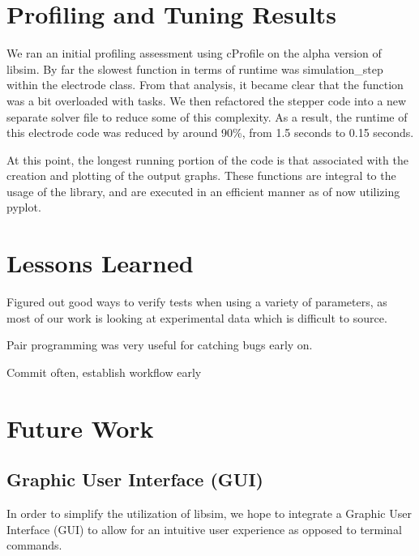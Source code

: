 \documentclass[letterpaper,10pt,english]{sphinxmanual}
\begin{document}
\chapter{Profiling and Tuning Results}
\label{\detokenize{profiling:profiling-and-tuning-results}}\label{\detokenize{profiling::doc}}
\sphinxAtStartPar
We ran an initial profiling assessment using cProfile on the alpha version of libsim.
By far the slowest function in terms of runtime was simulation\_step within the electrode
class. From that analysis, it became clear that the function was a bit overloaded with
tasks. We then refactored the stepper code into a new separate solver file to reduce
some of this complexity. As a result, the runtime of this electrode code was reduced
by around 90\%, from 1.5 seconds to 0.15 seconds.

\sphinxAtStartPar
At this point, the longest running portion of the code is that associated with the
creation and plotting of the output graphs. These functions are integral to the
usage of the library, and are executed in an efficient manner as of now utilizing pyplot.


\chapter{Lessons Learned}
\label{\detokenize{lessons_learned:lessons-learned}}\label{\detokenize{lessons_learned::doc}}
\sphinxAtStartPar
Figured out good ways to verify tests when using a variety of parameters,
as most of our work is looking at experimental data which is difficult
to source.

\sphinxAtStartPar
Pair programming was very useful for catching bugs early on.

\sphinxAtStartPar
Commit often, establish workflow early


\chapter{Future Work}
\label{\detokenize{future:future-work}}\label{\detokenize{future::doc}}

\section{Graphic User Interface (GUI)}
\label{\detokenize{future:graphic-user-interface-gui}}
\sphinxAtStartPar
In order to simplify the utilization of libsim, we hope to integrate
a Graphic User Interface (GUI) to allow for an intuitive user
experience as opposed to terminal commands.
\end{document}
